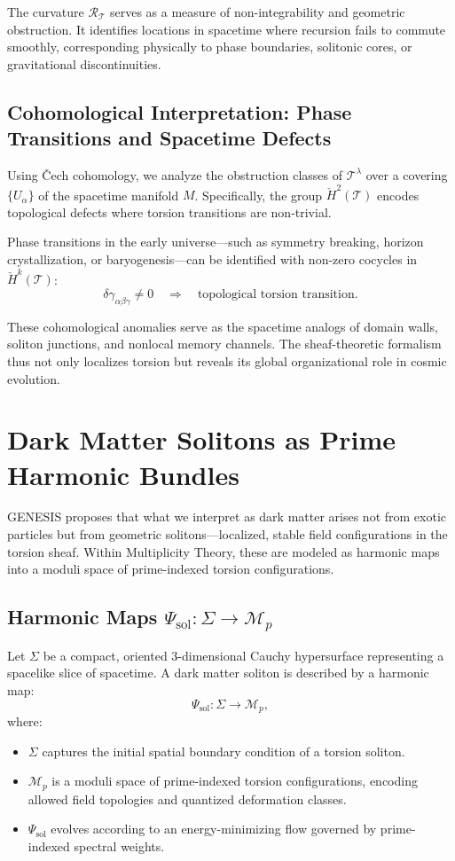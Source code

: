 \documentclass{article}
\theoremstyle{plain}
\begin{document}
The curvature $\mathcal{R}_{\mathcal{T}}$ serves as a measure of non-integrability and geometric obstruction. It identifies locations in spacetime where recursion fails to commute smoothly, corresponding physically to phase boundaries, solitonic cores, or gravitational discontinuities.

\subsection{Cohomological Interpretation: Phase Transitions and Spacetime Defects}

Using Čech cohomology, we analyze the obstruction classes of $\mathcal{T}^\lambda$ over a covering $\{U_\alpha\}$ of the spacetime manifold $M$. Specifically, the group $\check{H}^2(\mathcal{T})$ encodes topological defects where torsion transitions are non-trivial.

Phase transitions in the early universe—such as symmetry breaking, horizon crystallization, or baryogenesis—can be identified with non-zero cocycles in $\check{H}^k(\mathcal{T})$:
\[
\delta \gamma_{\alpha\beta\gamma} \neq 0 \quad \Rightarrow \quad \text{topological torsion transition}.
\]

These cohomological anomalies serve as the spacetime analogs of domain walls, soliton junctions, and nonlocal memory channels. The sheaf-theoretic formalism thus not only localizes torsion but reveals its global organizational role in cosmic evolution.

\section{Dark Matter Solitons as Prime Harmonic Bundles}

GENESIS proposes that what we interpret as dark matter arises not from exotic particles but from geometric solitons—localized, stable field configurations in the torsion sheaf. Within Multiplicity Theory, these are modeled as harmonic maps into a moduli space of prime-indexed torsion configurations.

\subsection{Harmonic Maps \texorpdfstring{$\Psi_{\text{sol}}: \Sigma \rightarrow \mathcal{M}_p$}{Ψsol: Σ → Mp}}

Let $\Sigma$ be a compact, oriented 3-dimensional Cauchy hypersurface representing a spacelike slice of spacetime. A dark matter soliton is described by a harmonic map:
\[
\Psi_{\text{sol}}: \Sigma \rightarrow \mathcal{M}_p,
\]
where:
\begin{itemize}
    \item $\Sigma$ captures the initial spatial boundary condition of a torsion soliton.
    \item $\mathcal{M}_p$ is a moduli space of prime-indexed torsion configurations, encoding allowed field topologies and quantized deformation classes.
    \item $\Psi_{\text{sol}}$ evolves according to an energy-minimizing flow governed by prime-indexed spectral weights.
\end{itemize}
\end{document}
